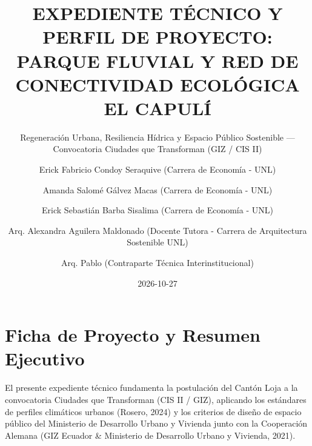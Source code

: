 \documentclass[
  spanish,
  letterpaper,
  DIV=11,
  numbers=noendperiod]{scrartcl}
\title{EXPEDIENTE TÉCNICO Y PERFIL DE PROYECTO: PARQUE FLUVIAL Y RED DE
CONECTIVIDAD ECOLÓGICA EL CAPULÍ}
\subtitle{Regeneración Urbana, Resiliencia Hídrica y Espacio Público
Sostenible --- Convocatoria Ciudades que Transforman (GIZ / CIS II)}
\author{Erick Fabricio Condoy Seraquive (Carrera de Economía -
UNL) \and Amanda Salomé Gálvez Macas (Carrera de Economía -
UNL) \and Erick Sebastián Barba Sisalima (Carrera de Economía -
UNL) \and Arq. Alexandra Aguilera Maldonado (Docente Tutora - Carrera de
Arquitectura Sostenible UNL) \and Arq. Pablo (Contraparte Técnica
Interinstitucional)}
\date{2026-10-27}
\begin{document}
\maketitle


\section{Ficha de Proyecto y Resumen
Ejecutivo}\label{ficha-de-proyecto-y-resumen-ejecutivo}

El presente expediente técnico fundamenta la postulación del Cantón Loja
a la convocatoria Ciudades que Transforman (CIS II / GIZ), aplicando los
estándares de perfiles climáticos urbanos (Rosero, 2024) y los criterios
de diseño de espacio público del Ministerio de Desarrollo Urbano y
Vivienda junto con la Cooperación Alemana (GIZ Ecuador \& Ministerio de
Desarrollo Urbano y Vivienda, 2021).
\end{document}
